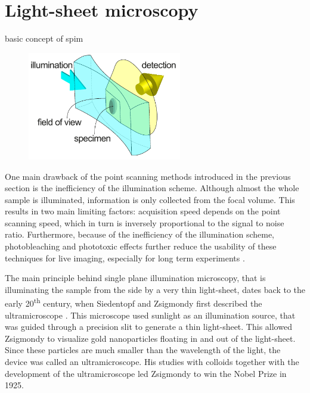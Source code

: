 \section{Light-sheet microscopy}
  \label{sec:light-sheet}
  basic concept of spim
  \begin{figure}[bt]
    \centering
    \includegraphics[width=0.6\textwidth]{spim_concept}
    \label{fig:spim_concept}
  \end{figure}


  One main drawback of the point scanning methods introduced in the previous section is the inefficiency of the illumination scheme. Although almost the whole sample is illuminated, information is only collected from the focal volume. This results in two main limiting factors: acquisition speed depends on the point scanning speed, which in turn is inversely proportional to the signal to noise ratio. Furthermore, because of the inefficiency of the illumination scheme, photobleaching and phototoxic effects further reduce the usability of these techniques for live imaging, especially for long term experiments \cite{reynaud_light_2008}.


  The main principle behind single plane illumination microscopy, that is illuminating the sample from the side by a very thin light-sheet, dates back to the early 20\textsuperscript{th} century, when Siedentopf and Zsigmondy first described the ultramicroscope \cite{siedentopf_uber_1902}. This microscope used sunlight as an illumination source, that was guided through a precision slit to generate a thin light-sheet. This allowed Zsigmondy to visualize gold nanoparticles floating in and out of the light-sheet. Since these particles are much smaller than the wavelength of the light, the device was called an ultramicroscope. His studies with colloids together with the development of the ultramicroscope led Zsigmondy to win the Nobel Prize in 1925.

